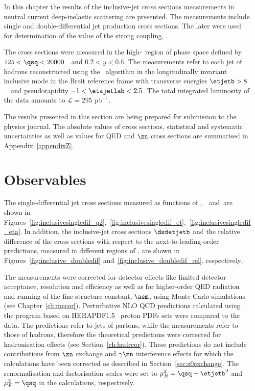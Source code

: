 In this chapter the results of the inclusive-jet cross sections measurements in neutral current deep-inelastic scattering are presented. The measurements include single and double-differential jet production cross sections. The later were used for determination of the value of the strong coupling, \asz. 

The cross sections were measured in the high-\qsq~region of phase space defined by $125 < \qsq < 20000$~\GeV~and $0.2<y<0.6$. The measurements refer to each jet of hadrons reconstructed using the \kt\, algorithm in the longitudinally invariant inclusive mode in the Breit reference frame with transverse energies $\etjetb > 8$~\GeV~and pseudorapidity $-1<\etajetlab<2.5$. The total integrated luminosity of the data amounts to $\mathcal{L}=295$ pb$^{-1}$.

The results presented in this section are being prepared for submission to the physics journal. The absolute values of cross sections, statistical and systematic uncertainties as well as values for QED and $\zn$ cross sections are summarised in Appendix~\ref{appendixZ}.

\section{Observables}
The single-differential jet cross sections measured as functions of \qsq,~\etjetb~and~\etajetlab are shown in Figures~\ref{fig:inclusivesingledif_q2},~\ref{fig:inclusivesingledif_et},~\ref{fig:inclusivesingledif_eta}. In addition, the inclusive-jet cross sections $\dsdetjetb$ and the relative difference of the cross sections with respect to the next-to-leading-order predictions, measured in different regions of \qsq, are shown in Figures~\ref{fig:inclusive_doubledif} and~\ref{fig:inclusive_doubledif_rel}, respectively.

The measurements were corrected for detector effects like limited detector acceptance, resolution and efficiency as well as for higher-order QED radiation and running of the fine-structure constant, $\aem$, using Monte Carlo simulations (see Chapter~\ref{ch:mccor}). Perturbative NLO QCD predictions calculated using the \nlojet program based on HERAPDF1.5~\cite{herapdf} proton PDFs sets were compared to the data. The \nlojet predictions refer to jets of partons, while the measurements refer to those of hadrons, therefore the theoretical predictions were corrected for hadronisation effects (see Section~\ref{ch:hadrcor}). These predictions do not include contributions from $\zn$ exchange and $\gamma\zn$ interference effects for which the calculations have been corrected as described in Section~\ref{sec:z0exchange}. The renormalisation and factorisation scales were set to $\mu_R^2 = \qsq + \etjetb^2$ and $\mu_F^2 = \qsq$ in the calculations, respectively.

